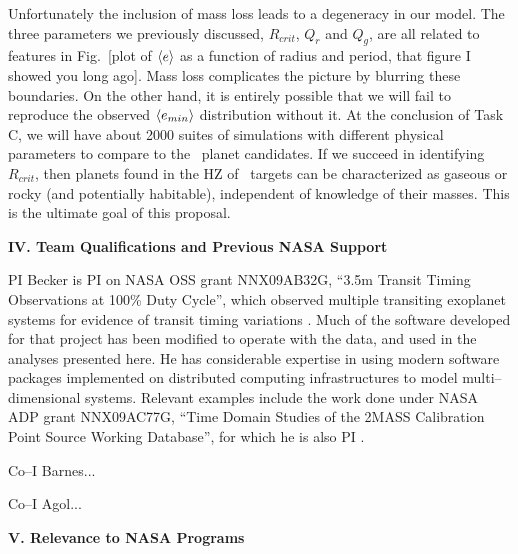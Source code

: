 Unfortunately the inclusion of mass loss leads to a degeneracy in our
model.  The three parameters we previously discussed, $R_{crit}$,
$Q_r$ and $Q_g$, are all related to features in Fig.~[plot of
  $\left< e \right>$ as a function of radius and period, that figure I showed
  you long ago].  Mass loss complicates the picture by blurring these
boundaries.  On the other hand, it is entirely possible that we will
fail to reproduce the observed $\left< e_{min} \right>$ distribution without
it.  At the conclusion of Task C, we will have about 2000 suites of
simulations with different physical parameters to compare to the
\kepler~planet candidates.  If we succeed in identifying $R_{crit}$,
then planets found in the HZ of \kepler~targets can be characterized
as gaseous or rocky (and potentially habitable), independent of
knowledge of their masses.  This is the ultimate goal of this
proposal.

\bigskip
\centerline{\bf IV. Team Qualifications and Previous NASA Support}
\smallskip

PI Becker is PI on NASA OSS grant NNX09AB32G, ``3.5m Transit Timing
Observations at 100\% Duty Cycle'', which observed multiple transiting
exoplanet systems for evidence of transit timing variations
\citep{2011ApJ...731..123K, 2013ApJ...764....8K, 2013ApJ...764L..17B,
  2013arXiv1304.5713K}.  Much of the software developed for that
project has been modified to operate with the \kepler data, and used in
the analyses presented here.  He has considerable expertise in using
modern software packages implemented on distributed computing
infrastructures to model multi--dimensional systems.  Relevant
examples include the work done under NASA ADP grant NNX09AC77G, ``Time
Domain Studies of the 2MASS Calibration Point Source Working
Database'', for which he is also PI
\citep{2012ApJ...748...58D,2013ApJ...764...62D}.

Co--I Barnes...

Co--I Agol...

\bigskip
\centerline{\bf V. Relevance to NASA Programs}
\smallskip

